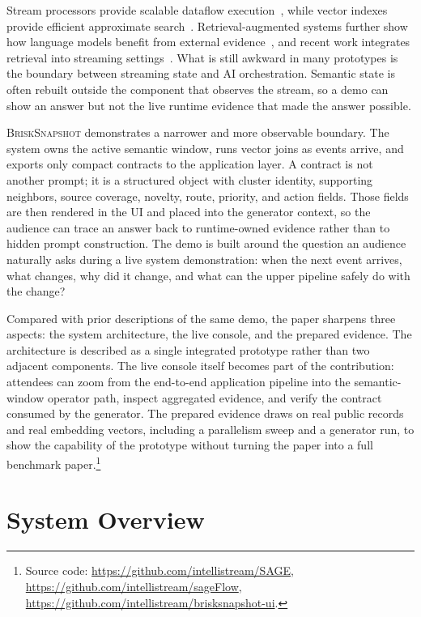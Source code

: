 \documentclass[sigconf]{acmart}
\newcommand{\system}{\textsc{BriskSnapshot}}
\begin{document}
Stream processors provide scalable dataflow execution~\cite{akidau2015dataflow,carbone2015apache}, while vector indexes provide efficient approximate search~\cite{jegou2011product,johnson2019billion,malkov2020efficient}. Retrieval-augmented systems further show how language models benefit from external evidence~\cite{lewis2020rag,guu2020realm}, and recent work integrates retrieval into streaming settings~\cite{lu2025vectraflow,sankaradas2024streamingrag}. What is still awkward in many prototypes is the boundary between streaming state and AI orchestration. Semantic state is often rebuilt outside the component that observes the stream, so a demo can show an answer but not the live runtime evidence that made the answer possible.

\system{} demonstrates a narrower and more observable boundary. The system owns the active semantic window, runs vector joins as events arrive, and exports only compact contracts to the application layer. A contract is not another prompt; it is a structured object with cluster identity, supporting neighbors, source coverage, novelty, route, priority, and action fields. Those fields are then rendered in the UI and placed into the generator context, so the audience can trace an answer back to runtime-owned evidence rather than to hidden prompt construction. The demo is built around the question an audience naturally asks during a live system demonstration: when the next event arrives, what changes, why did it change, and what can the upper pipeline safely do with the change?

Compared with prior descriptions of the same demo, the paper sharpens three aspects: the system architecture, the live console, and the prepared evidence. The architecture is described as a single integrated prototype rather than two adjacent components. The live console itself becomes part of the contribution: attendees can zoom from the end-to-end application pipeline into the semantic-window operator path, inspect aggregated evidence, and verify the contract consumed by the generator. The prepared evidence draws on real public records and real embedding vectors, including a parallelism sweep and a generator run, to show the capability of the prototype without turning the paper into a full benchmark paper.\footnote{Source code: \url{https://github.com/intellistream/SAGE}, \url{https://github.com/intellistream/sageFlow}, \url{https://github.com/intellistream/brisksnapshot-ui}.}

\section{System Overview}
\end{document}
